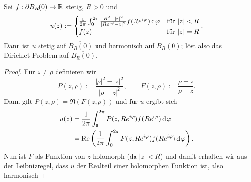 \begin{thm}
  \label{thm:poisson}
  Sei $f: \partial B_R(0) \rightarrow \mathbb{R}$ stetig, $R > 0$ und
\begin{align*}
    u(z) :=
    \begin{cases}
      \frac{1}{2\pi} \int_0^{2\pi} \frac{R^2 - |z|^2}{|Re^{i\phi}
        - z|^2} f(R e^{i\phi}) \d[\phi] & \text{für } |z| < R\\
      f(z) & \text{für } |z| = R
    \end{cases}.
  \end{align*}
  Dann ist $u$ stetig auf $\overline{B_R(0)}$ und harmonisch auf $B_R(0)$;
  löst also das Dirichlet-Problem auf $\overline{B_R(0)}$.
\end{thm}

\begin{proof}
  Für $z \neq \rho$ definieren wir
  \[
  P(z, \rho) := \frac{|\rho|^2 - |z|^2}{|\rho - z|^2}, \qquad
  F(z,\rho) := \frac{\rho +z }{\rho - z}.
  \]
  Dann gilt $P(z, \rho) = \Re(F(z, \rho))$ und für $u$ ergibt sich
  \begin{align*}
    u(z) & = \frac{1}{2\pi} \int_0^{2\pi} P(z, Re^{i\phi})
    f(Re^{i\phi}) \d[\phi] \\
    & = \Re \left ( \frac{1}{2\pi} \int_0^{2\pi} F(z, Re^{i\phi})
      f(Re^{i\phi}) \d[\phi] \right ).
  \end{align*}
  Nun ist $F$ als Funktion von $z$ holomorph (da $|z| < R$) 
  und damit erhalten wir aus der Leibnizregel, dass $u$ der Realteil
  einer holomorphen Funktion ist, also harmonisch.
  

\end{proof}
